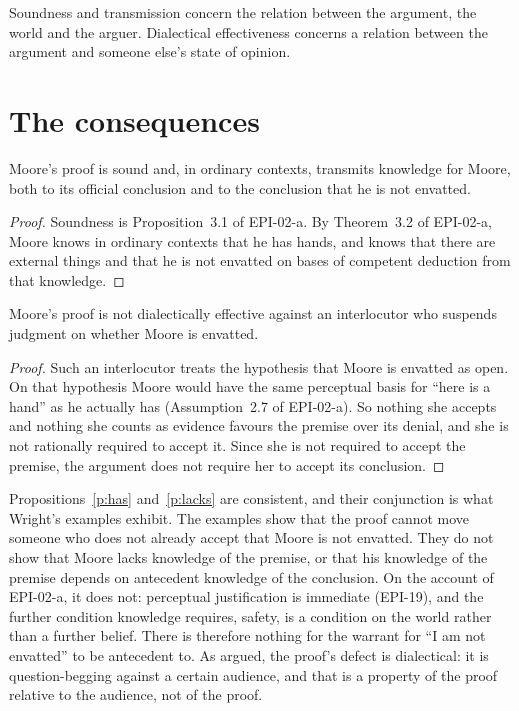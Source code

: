 \documentclass{situationist-preprint}
\begin{document}
Soundness and transmission concern the relation between the argument, the world and the arguer. Dialectical effectiveness concerns a relation between the argument and someone else's state of opinion.

\section{The consequences}

\begin{proposition}\label{p:has}
Moore's proof is sound and, in ordinary contexts, transmits knowledge for Moore, both to its official conclusion and to the conclusion that he is not envatted.
\end{proposition}

\begin{proof}
Soundness is Proposition~3.1 of EPI-02-a. By Theorem~3.2 of EPI-02-a, Moore knows in ordinary contexts that he has hands, and knows that there are external things and that he is not envatted on bases of competent deduction from that knowledge.
\end{proof}

\begin{proposition}\label{p:lacks}
Moore's proof is not dialectically effective against an interlocutor who suspends judgment on whether Moore is envatted.
\end{proposition}

\begin{proof}
Such an interlocutor treats the hypothesis that Moore is envatted as open. On that hypothesis Moore would have the same perceptual basis for \enquote{here is a hand} as he actually has (Assumption~2.7 of EPI-02-a). So nothing she accepts and nothing she counts as evidence favours the premise over its denial, and she is not rationally required to accept it. Since she is not required to accept the premise, the argument does not require her to accept its conclusion.
\end{proof}

Propositions~\ref{p:has} and~\ref{p:lacks} are consistent, and their conjunction is what Wright's examples exhibit. The examples show that the proof cannot move someone who does not already accept that Moore is not envatted. They do not show that Moore lacks knowledge of the premise, or that his knowledge of the premise depends on antecedent knowledge of the conclusion. On the account of EPI-02-a, it does not: perceptual justification is immediate (EPI-19), and the further condition knowledge requires, safety, is a condition on the world rather than a further belief. There is therefore nothing for the warrant for \enquote{I am not envatted} to be antecedent to. As \citet{Pryor2004} argued, the proof's defect is dialectical: it is question-begging against a certain audience, and that is a property of the proof relative to the audience, not of the proof.
\end{document}
